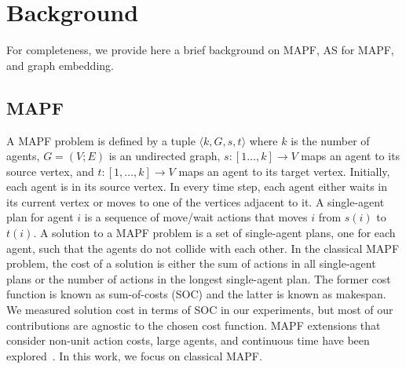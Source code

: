 \documentclass{ecai}
\newcommand{\tuple}[1]{\ensuremath{\langle #1\rangle}}
\newcommand{\Roni}[1]{}
\begin{document}





\section{Background}
\label{scn:Background}


For completeness, we provide here a brief background on MAPF, AS for MAPF, and graph embedding. 

\subsection{MAPF}
A MAPF problem is defined by a tuple $\tuple{k,G,s,t}$ 
where 
$k$ is the number of agents, 
$G = (V;E)$ is an undirected graph, 
$s: [1\ldots, k]\rightarrow V$ maps an agent to its source vertex, 
and $t: [1,\ldots, k]\rightarrow V$ maps an agent to its target vertex. 
Initially, each agent is in its source vertex.
In every time step, each agent either waits
in its current vertex or moves to one of the vertices adjacent to it. 
A single-agent plan for agent $i$ is a sequence of move/wait actions that moves $i$ from $s(i)$ to $t(i)$. 
A solution to a MAPF problem is a set of single-agent plans, one for each agent, such that the agents do not collide with each other. 
In the classical MAPF problem, the cost of a solution is either the sum of actions in all single-agent plans
or the number of actions in the longest single-agent plan. The former cost function is known as sum-of-costs (SOC) and the latter is known as makespan. 
We measured solution cost in terms of SOC in our experiments, but most of our contributions are agnostic to the chosen cost function.   
MAPF extensions that consider non-unit action costs, large agents, and continuous time have been explored~\cite{atzmon2020generalizing,andreychuk2022multi,li2019multi}. In this work, we focus on classical MAPF.  
\end{document}
